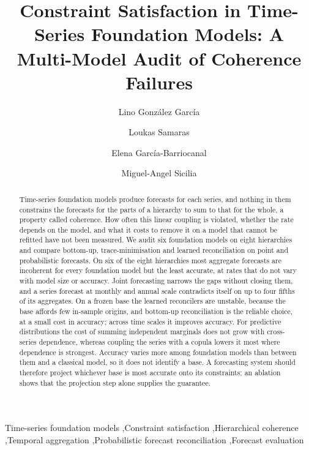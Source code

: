 \documentclass[review,number]{elsarticle}
\begin{document}
\begin{frontmatter}

\title{Constraint Satisfaction in Time-Series Foundation Models:
A Multi-Model Audit of Coherence Failures}

\author[uah]{Lino González García}
\author[uah]{Loukas Samaras}
\author[uah]{Elena García-Barriocanal}
\author[uah]{Miguel-Angel Sicilia}

\begin{abstract}
Time-series foundation models produce forecasts for each series, and nothing in them
constrains the forecasts for the parts of a hierarchy to sum to that for the whole, a
property called coherence. How often this linear coupling is violated, whether the rate
depends on the model, and what it costs to remove it on a model that cannot be refitted
have not been measured. We audit six foundation models on eight hierarchies and compare
bottom-up, trace-minimisation and learned reconciliation on point and probabilistic
forecasts. On six of the eight hierarchies most aggregate forecasts are incoherent for
every foundation model but the least accurate, at rates that do not vary with model size
or accuracy. Joint forecasting narrows the gaps without closing them, and a series
forecast at monthly and annual scale contradicts itself on up to four fifths of its
aggregates. On a frozen base the learned reconcilers are unstable, because the base
affords few in-sample origins, and bottom-up reconciliation is the reliable choice, at a
small cost in accuracy; across time scales it improves accuracy. For predictive
distributions the cost of summing independent marginals does not grow with cross-series
dependence, whereas coupling the series with a copula lowers it most where dependence is
strongest. Accuracy varies more among foundation models than between them and a
classical model, so it does not identify a base. A forecasting system should therefore
project whichever base is most accurate onto its constraints; an ablation shows that the
projection step alone supplies the guarantee.
\end{abstract}

\begin{keyword}
Time-series foundation models \sep Constraint satisfaction \sep Hierarchical coherence
\sep Temporal aggregation \sep Probabilistic forecast reconciliation \sep Forecast evaluation
\end{keyword}

\end{frontmatter}
\end{document}
